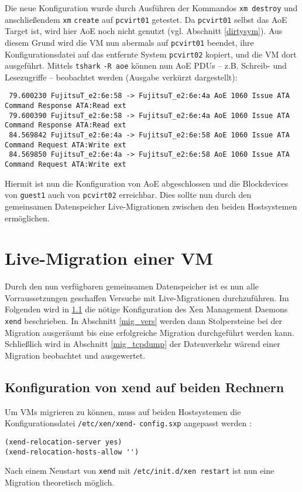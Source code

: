 Die neue Konfiguration wurde durch Ausführen der Kommandos \verb#xm destroy# und anschließendem \verb#xm# \verb#create# auf \verb#pcvirt01# getestet. Da \verb#pcvirt01# selbst das AoE Target ist, wird hier AoE noch nicht genutzt (vgl. Abschnitt \ref{dirtysym}).
Aus diesem Grund wird die VM nun abermals auf \verb#pcvirt01# beendet, ihre Konfigurationsdatei auf das entfernte System \verb#pcvirt02# kopiert, und die VM dort ausgeführt. Mittels \verb#tshark# \verb#-R aoe# können nun AoE PDUs -- z.B. Schreib- und Lesezugriffe -- beobachtet werden (Ausgabe verkürzt dargestellt):
\setupVerbatimOut
\begin{verbatim}
 79.600230 FujitsuT_e2:6e:58 -> FujitsuT_e2:6e:4a AoE 1060 Issue ATA Command Response ATA:Read ext
 79.600390 FujitsuT_e2:6e:58 -> FujitsuT_e2:6e:4a AoE 1060 Issue ATA Command Response ATA:Read ext
 84.569842 FujitsuT_e2:6e:4a -> FujitsuT_e2:6e:58 AoE 1060 Issue ATA Command Request ATA:Write ext
 84.569850 FujitsuT_e2:6e:4a -> FujitsuT_e2:6e:58 AoE 1060 Issue ATA Command Request ATA:Write ext
\end{verbatim}

Hiermit ist nun die Konfiguration von AoE abgeschlossen und die Blockdevices von \verb#guest1# auch von \verb#pcvirt02# erreichbar. Dies sollte nun durch den gemeinsamen Datenspeicher Live-Migrationen zwischen den beiden Hostsystemen ermöglichen.

\chapter{Live-Migration einer VM}
Durch den nun verfügbaren gemeinsamen Datenspeicher ist es nun alle Vorraussetzungen geschaffen Versuche mit Live-Migrationen durchzuführen. Im Folgenden wird in \ref{xend_konfig} die nötige Konfiguration des Xen Management Daemons \verb#xend# beschrieben. In Abschnitt \ref{mig_vers} werden dann Stolpersteine bei der Migration ausgeräumt bis eine erfolgreiche Migration durchgeführt werden kann. Schließlich wird in Abschnitt \ref{mig_tcpdump} der Datenverkehr wärend einer Migration beobachtet und ausgewertet.
\section{Konfiguration von xend auf beiden Rechnern}\label{xend_konfig}
Um VMs migrieren zu können, muss auf beiden Hostsystemen die Konfigurationsdatei \verb#/etc/xen/xend-# \verb#config.sxp# angepasst werden \cite{man_xendconfig}:
\setupVerbatimOut
\begin{verbatim}
(xend-relocation-server yes)
(xend-relocation-hosts-allow '')
\end{verbatim} 
Nach einem Neustart von \verb#xend# mit \verb#/etc/init.d/xen restart# ist nun eine Migration theoretisch möglich. 

